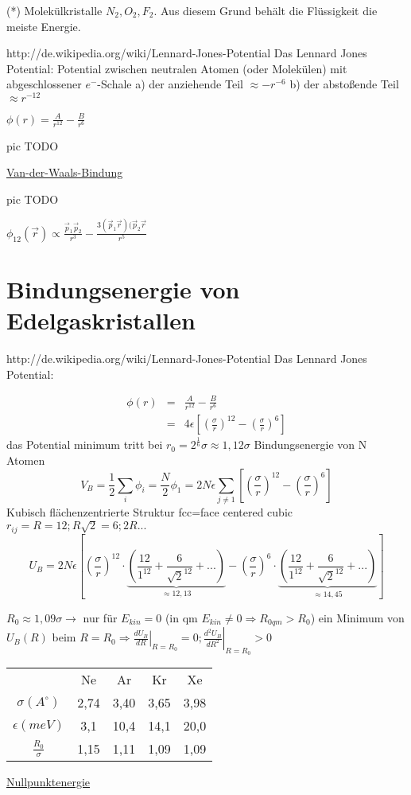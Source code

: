 (*) Molekülkristalle \(N_2,O_2,F_2\). Aus diesem Grund behält die Flüssigkeit die
meiste Energie.


http://de.wikipedia.org/wiki/Lennard-Jones-Potential
Das Lennard Jones Potential:
Potential zwischen neutralen Atomen (oder Molekülen) mit abgeschlossener
\(e^-\)-Schale
a) der anziehende Teil \(\approx -r^{-6}\)
b) der abstoßende Teil \(\approx r^{-12}\)

\(\boxed{\phi(r)=\frac A {r^{12}}-\frac B {r^{6}}}\)

pic TODO

\underline{Van-der-Waals-Bindung}

pic TODO

\(\phi_{12}(\vec r) \propto \frac {\vec p_1\vec p_2}{r^3}-\frac{3(\vec p_1 \vec
  r)(\vec p_2 \vec r}{r^5}\)

\section{Bindungsenergie von Edelgaskristallen}

http://de.wikipedia.org/wiki/Lennard-Jones-Potential
Das Lennard Jones Potential:

 
\begin{eqnarray}
\phi(r) &=& \frac A {r^{12}}-\frac B {r^6} \\
&=&4\epsilon \left[ \left(\frac\sigma r\right)^{12}-\left(\frac\sigma r\right)^6\right]
\end{eqnarray}
das Potential minimum tritt bei \(r_0=2^{\frac 1 6}\sigma\approx 1,12\sigma\)
Bindungsenergie von N Atomen
\[ V_B=\frac 1 2 \sum_i\phi_i=\frac N 2 \phi_1=2N\epsilon\sum_{j\neq1}\left[
  \left(\frac\sigma r\right)^{12}-\left(\frac\sigma r\right)^6\right] \]
Kubisch flächenzentrierte Struktur fcc=face centered cubic \(r_{ij}=R=12;R\sqrt
2=6;2R...\)
\[ U_B=2N\epsilon\left[
  \left(\frac\sigma r\right)^{12}\cdot\underbrace{
    \left(\frac{12}{1^12}+\frac{6}{\sqrt 2^{12}}+...\right)}_{\approx 12,13}
-\left(\frac\sigma r\right)^6 \cdot\underbrace{
  \left(\frac{12}{1^12}+\frac{6}{\sqrt 2^{12}}+...\right)}_{\approx 14,45}
\right]
\]

\(R_0\approx 1,09\sigma\rightarrow\) nur für \(E_{kin}=0\) (in qm \(E_{kin}\neq
0\Rightarrow R_{0qm}>R_0\)) ein Minimum von \(U_B(R)\) beim
\(R=R_0\Rightarrow\left.\frac{dU_B}{dR}\right|_{R=R_0}=0;\left.\frac{d^2U_B}{dR^2}\right|_{R=R_0}>0\)

\begin{tabular}{c|cccc}
&Ne&Ar&Kr&Xe \\
\(\sigma(A^{\circ})\)&2,74&3,40&3,65&3,98 \\
\(\epsilon(meV)\)&3,1&10,4&14,1&20,0 \\
\(\frac {R_0} \sigma\)&1,15&1,11&1,09&1,09
\end{tabular}

\underline{Nullpunktenergie}

